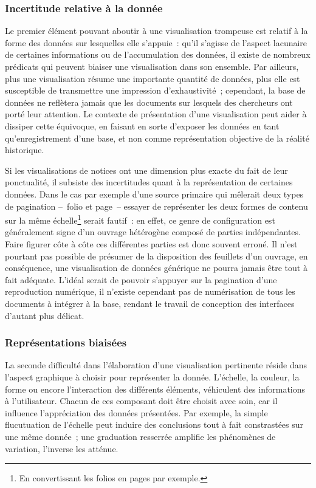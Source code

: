 \documentclass[a4paper,12pt,twoside]{book}
\newcommand{\bdd}{base de données\xspace}
\begin{document}
			\subsubsection{Incertitude relative à la donnée}
Le premier élément pouvant aboutir à une visualisation trompeuse est relatif à la forme des données sur lesquelles elle s'appuie~: qu'il s'agisse de l'aspect lacunaire de certaines informations ou de l'accumulation des données, il existe de nombreux prédicats qui peuvent biaiser une visualisation dans son ensemble. Par ailleurs, plus une visualisation résume une importante quantité de données, plus elle est susceptible de transmettre une impression d'exhaustivité~; cependant, la \bdd ne reflètera jamais que les documents sur lesquels des chercheurs ont porté leur attention. Le contexte de présentation d'une visualisation peut aider à dissiper cette équivoque, en faisant en sorte d'exposer les données en tant qu'enregistrement d'une base, et non comme représentation objective de la réalité historique.

Si les visualisations de notices ont une dimension plus exacte du fait de leur ponctualité, il subsiste des incertitudes quant à la représentation de certaines données. Dans le cas par exemple d'une source primaire qui mêlerait deux types de pagination –~folio et page~– essayer de représenter les deux formes de contenu sur la même échelle\footnote{En convertissant les folios en pages par exemple.} serait fautif~: en effet, ce genre de configuration est généralement signe d'un ouvrage hétérogène composé de parties indépendantes. Faire figurer côte à côte ces différentes parties est donc souvent erroné. Il n'est pourtant pas possible de présumer de la disposition des feuillets d'un ouvrage, en conséquence, une visualisation de données générique ne pourra jamais être tout à fait adéquate. L'idéal serait de pouvoir s'appuyer sur la pagination d'une reproduction numérique, il n'existe cependant pas de numérisation de tous les documents à intégrer à la base, rendant le travail de conception des interfaces d'autant plus délicat.

			\subsubsection{Représentations biaisées}
La seconde difficulté dans l'élaboration d'une visualisation pertinente réside dans l'aspect graphique à choisir pour représenter la donnée. L'échelle, la couleur, la forme ou encore l'interaction des différents éléments, véhiculent des informations à l'utilisateur. Chacun de ces composant doit être choisit avec soin, car il influence l'appréciation des données présentées. Par exemple, la simple flucutuation de l'échelle peut induire des conclusions tout à fait constrastées sur une même donnée~; une graduation resserrée amplifie les phénomènes de variation, l'inverse les atténue.
\end{document}
